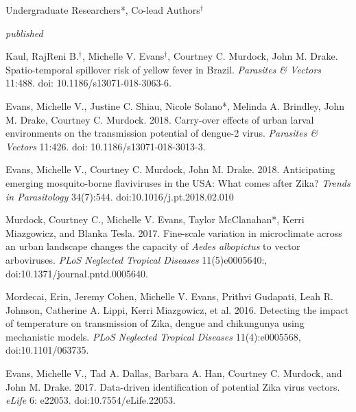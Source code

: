 


\bigskip
Undergraduate Researchers*, Co-lead Authors$^\dagger$

\smallskip

\textit{published}
\smallskip

\begin{etaremune}

\item Kaul, RajReni B.$^\dagger$, \textcolor{awesome}{Michelle V. Evans}$^\dagger$, Courtney C. Murdock, John M. Drake. Spatio-temporal spillover risk of yellow fever in Brazil. \textit{Parasites \& Vectors} 11:488. doi: 10.1186/s13071-018-3063-6.
\smallskip

\item \textcolor{awesome}{Evans, Michelle V.}, Justine C. Shiau, Nicole Solano*, Melinda A. Brindley, John M. Drake, Courtney C. Murdock. 2018. Carry-over effects of urban larval environments on the transmission potential of dengue-2 virus. \textit{Parasites \& Vectors} 11:426. doi: 10.1186/s13071-018-3013-3.

\item \textcolor{awesome}{Evans, Michelle V.}, Courtney C. Murdock, John M. Drake. 2018. Anticipating emerging mosquito-borne flaviviruses in the USA: What comes after Zika? \textit{Trends in Parasitology} 34(7):544. \linebreak doi:10.1016/j.pt.2018.02.010

\item Murdock, Courtney C., \textcolor{awesome}{Michelle V. Evans}, Taylor McClanahan*, Kerri Miazgowicz, and Blanka Tesla. 2017. Fine-scale variation in microclimate across an urban landscape changes the capacity of \textit{Aedes albopictus} to vector arboviruses. \textit{PLoS Neglected Tropical Diseases} 11(5)e0005640:, \linebreak doi:10.1371/journal.pntd.0005640.
\smallskip

\item Mordecai, Erin, Jeremy Cohen, \textcolor{awesome}{Michelle V. Evans}, Prithvi Gudapati, Leah R. Johnson, Catherine A. Lippi, Kerri Miazgowicz, et al. 2016. Detecting the impact of temperature on transmission of Zika, dengue and chikungunya using mechanistic models. \textit{PLoS Neglected Tropical Diseases} 11(4):e0005568, \linebreak doi:10.1101/063735.
\smallskip

\item \textcolor{awesome}{Evans, Michelle V.}, Tad A. Dallas, Barbara A. Han, Courtney C. Murdock, and John M. Drake. 2017. Data-driven identification of potential Zika virus vectors. \textit{eLife} 6: e22053. doi:10.7554/eLife.22053.
\end{etaremune}

\bigskip

